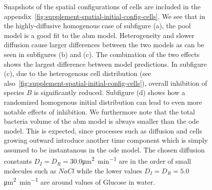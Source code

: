 \documentclass[10pt,A4paper]{article}
\numberwithin{equation}{section}
\begin{document}
\begin{figure}
{        Snapshots of the spatial configurations of cells are included in the appendix~\ref{fig:supplement-spatial-initial-config-cells}.
        We see that in the highly-diffusive homogenous case of subfigure (a), the pool model is a good fit to the \ac{abm} model.
        Heterogeneity and slower diffusion cause larger differences between the two models as can be seen in subfigures (b) and (c).
        The combination of the two effects shows the largest difference between model predictions.
        In subfigure (c), due to the heterogenous cell distribution (see also~\ref{fig:supplement-spatial-initial-config-cells}), overall inhibition of species $B$ is significantly reduced.
        Subfigure (d) shows how a randomized homogenous initial distribution can lead to even more notable effects of inhibition.
        We furthermore note that the total bacteria volume of the \ac{abm} model is always smaller than the \ac{ode} model.
        This is expected, since processes such as diffusion and cells growing outward introduce another time component which is simply assumed to be instantanous in the \ac{ode} model.
        The chosen diffusion constants $D_I=D_R=30.0$\unit{\micro\metre\squared\per\minute} are in the order of small molecules such as $NaCl$ while the lower values $D_I=D_R=5.0$\unit{\micro\metre\squared\per\minute} are around values of Glucose in water.
    }
    \label{fig:spatial-growth-curve}
\end{figure}
%
%
\end{document}
